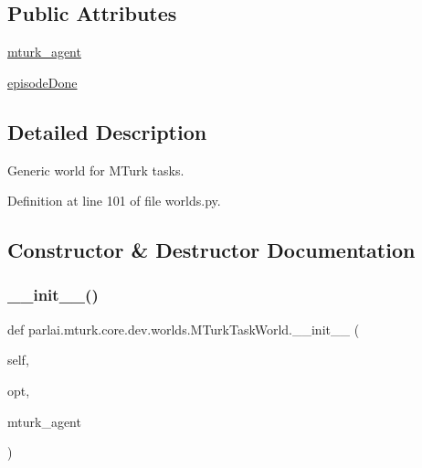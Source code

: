 \subsection*{Public Attributes}
\begin{DoxyCompactItemize}
\item 
\hyperlink{classparlai_1_1mturk_1_1core_1_1dev_1_1worlds_1_1MTurkTaskWorld_ac57f970ab26bb0526c73c03c1b8cad70}{mturk\+\_\+agent}
\item 
\hyperlink{classparlai_1_1mturk_1_1core_1_1dev_1_1worlds_1_1MTurkTaskWorld_a31c19dded93517b4a840dbba6dbb6612}{episode\+Done}
\end{DoxyCompactItemize}


\subsection{Detailed Description}
\begin{DoxyVerb}Generic world for MTurk tasks.
\end{DoxyVerb}
 

Definition at line 101 of file worlds.\+py.



\subsection{Constructor \& Destructor Documentation}
\mbox{\label{classparlai_1_1mturk_1_1core_1_1dev_1_1worlds_1_1MTurkTaskWorld_a05dadf953dc8d31e3ab9251abb97d591}} 
\subsubsection{\texorpdfstring{\+\_\+\+\_\+init\+\_\+\+\_\+()}{\_\_init\_\_()}}
{\footnotesize\ttfamily def parlai.\+mturk.\+core.\+dev.\+worlds.\+M\+Turk\+Task\+World.\+\_\+\+\_\+init\+\_\+\+\_\+ (\begin{DoxyParamCaption}\item[{}]{self,  }\item[{}]{opt,  }\item[{}]{mturk\+\_\+agent }\end{DoxyParamCaption})}

